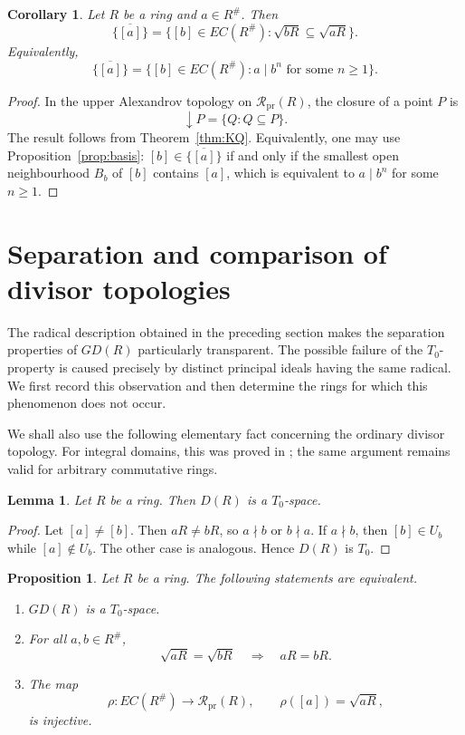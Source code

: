 \documentclass[11pt]{amsart}
\theoremstyle{plain}
\newtheorem{proposition}[theorem]{Proposition}
\newtheorem{corollary}[theorem]{Corollary}
\newtheorem{lemma}[theorem]{Lemma}
\theoremstyle{definition}
\theoremstyle{remark}
\numberwithin{equation}{section}
\begin{document}
\begin{corollary}\label{cor:closure}
	Let $R$ be a ring and $a\in R^\#$. Then
	\[
	\overline{\{[a]\}}
	=
	\{[b]\in EC(R^\#):
	\sqrt{bR}\subseteq\sqrt{aR}\}.
	\]
	Equivalently,
	\[
	\overline{\{[a]\}}
	=
	\{[b]\in EC(R^\#):
	a\mid b^n\text{ for some }n\geq1\}.
	\]
\end{corollary}

\begin{proof}
	In the upper Alexandrov topology on
	$\mathcal R_{\mathrm{pr}}(R)$, the closure of a point $P$ is
	\[
	\downarrow P=\{Q:Q\subseteq P\}.
	\]
	The result follows from Theorem~\ref{thm:KQ}. Equivalently, one may use
	Proposition~\ref{prop:basis}: $[b]\in\overline{\{[a]\}}$ if and only if
	the smallest open neighbourhood $B_b$ of $[b]$ contains $[a]$, which is
	equivalent to $a\mid b^n$ for some $n\geq1$.
\end{proof}

\section{Separation and comparison of divisor topologies}

The radical description obtained in the preceding section makes the
separation properties of $GD(R)$ particularly transparent. The possible
failure of the $T_0$-property is caused precisely by distinct principal
ideals having the same radical. We first record this observation and then
determine the rings for which this phenomenon does not occur.

We shall also use the following elementary fact concerning the ordinary
divisor topology. For integral domains, this was proved in
\cite[Proposition 2]{YigitKoc}; the same argument remains valid for
arbitrary commutative rings.

\begin{lemma}\label{lem:D-T0}
	Let $R$ be a ring. Then $D(R)$ is a $T_0$-space.
\end{lemma}

\begin{proof}
	Let $[a]\neq[b]$. Then $aR\neq bR$, so $a\nmid b$ or $b\nmid a$.
	If $a\nmid b$, then $[b]\in U_b$ while $[a]\notin U_b$.
	The other case is analogous. Hence $D(R)$ is $T_0$.
\end{proof}


\begin{proposition}\label{prop:T0}
	Let $R$ be a ring. The following statements are equivalent.
	\begin{enumerate}
		\item $GD(R)$ is a $T_0$-space.
		\item For all $a,b\in R^\#$,
		\[
		\sqrt{aR}=\sqrt{bR}
		\quad\Longrightarrow\quad
		aR=bR.
		\]
		\item The map
		\[
		\rho:EC(R^\#)\longrightarrow\mathcal R_{\mathrm{pr}}(R),
		\qquad
		\rho([a])=\sqrt{aR},
		\]
		is injective.
	\end{enumerate}
\end{proposition}
\end{document}

